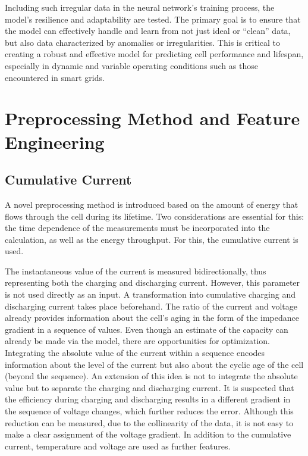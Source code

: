 \documentclass[energies,article,accept,pdftex,moreauthors]{Definitions/mdpi}
\begin{document}
Including such irregular data in the neural network's training process, the model's resilience and adaptability are tested. The primary goal is to ensure that the model can effectively handle and learn from not just ideal or ``clean'' data, but also data characterized by anomalies or irregularities. This is critical to creating a robust and effective model for predicting cell performance and lifespan, especially in dynamic and variable operating conditions such as those encountered in smart grids.


\section{Preprocessing Method and Feature Engineering} \label{sec3}

\subsection{Cumulative Current} 
A novel preprocessing method is introduced based on the amount of energy that flows through the cell during its lifetime. Two considerations are essential for this: the time dependence of the measurements must be incorporated into the calculation, as well as the energy throughput. For this, the cumulative current is used.

The instantaneous value of the current is measured bidirectionally, thus representing both the charging and discharging current. However, this parameter is not used directly as an input. A transformation into cumulative charging and discharging current takes place beforehand. The ratio of the current and voltage already provides information about the cell's aging in the form of the impedance gradient in a sequence of values. Even though an estimate of the capacity can already be made via the model, there are opportunities for optimization. Integrating the absolute value of the current within a sequence encodes information about the level of the current but also about the cyclic age of the cell (beyond the sequence). An extension of this idea is not to integrate the absolute value but to separate the charging and discharging current. It is suspected that the efficiency during charging and discharging results in a different gradient in the sequence of voltage changes, which further reduces the error. Although this reduction can be measured, due to the collinearity of the data, it is not easy to make a clear assignment of the voltage gradient. In addition to the cumulative current, temperature and voltage are used as further features.
\end{document}
